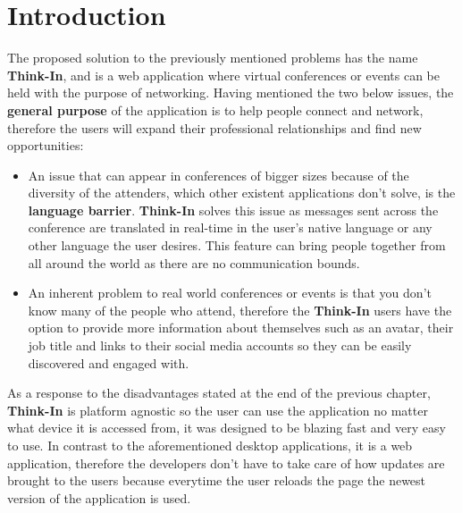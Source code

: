 \chapter*{Introduction} 

The proposed solution to the previously mentioned problems has the name \textbf{Think-In}, and is a web application where virtual conferences or events can be held with the purpose of networking.
Having mentioned the two below issues, the \textbf{general purpose} of the application is to help people connect and network, therefore the users will expand their professional relationships and find new opportunities:

\begin{itemize}
    \item 
An issue that can appear in conferences of bigger sizes because of the diversity of the attenders, which other existent applications don't solve, is the \textbf{language barrier}. \textbf{Think-In} solves this issue as messages sent across the conference are translated in real-time in the user's native language or any other language the user desires. This feature can bring people together from all around the world as there are no communication bounds.
    \item
An inherent problem to real world conferences or events is that you don't know many of the people who attend, therefore the \textbf{Think-In} users have the option to provide more information about themselves such as an avatar, their job title and links to their social media accounts so they can be easily discovered and engaged with.
\end{itemize}

As a response to the disadvantages stated at the end of the previous chapter, \textbf{Think-In} is platform agnostic so the user can use the application no matter what device it is accessed from, it was designed to be blazing fast and very easy to use. In contrast to the aforementioned desktop applications, it is a web application, therefore the developers don't have to take care of how updates are brought to the users because everytime the user reloads the page the newest version of the application is used.

